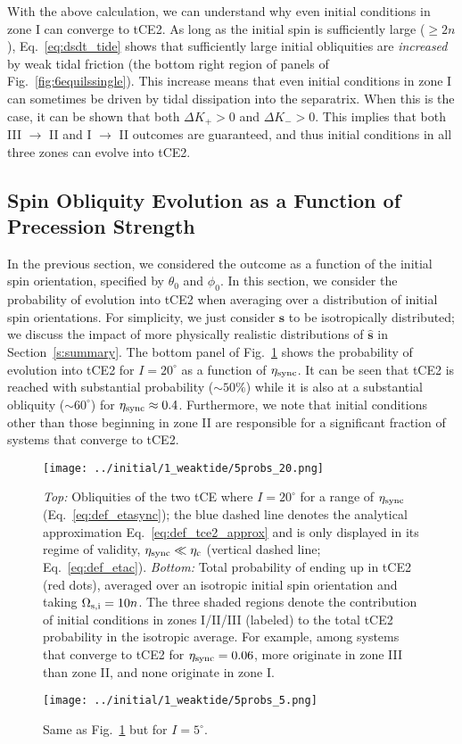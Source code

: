 \documentclass[
        fleqn,
        usenatbib,
    ]{mnras}
\newcommand*{\uv}[1]{\hat{\boldsymbol{\mathbf{#1}}}}
\begin{document}
With the above calculation, we can understand why even initial conditions in
zone I can converge to tCE2. As long as the initial spin is sufficiently large
($\geq 2n$), Eq.~\eqref{eq:dsdt_tide} shows that sufficiently large initial
obliquities are \emph{increased} by weak tidal friction (the bottom right
region of panels of Fig.~\ref{fig:6equilssingle}). This increase means that even
initial conditions in zone I can sometimes be driven by tidal dissipation into
the separatrix. When this is the case, it can be shown that both $\Delta K_+ >
0$ and $\Delta K_- > 0$. This implies that both III $\to$ II and I $\to$ II
outcomes are guaranteed, and thus initial conditions in all three zones can
evolve into tCE2.

\subsection{Spin Obliquity Evolution as a Function of Precession Strength
}\label{ss:tce2_etasync}

In the previous section, we considered the outcome as a function of the initial
spin orientation, specified by $\theta_0$ and $\phi_0$. In this section, we
consider the probability of evolution into tCE2 when averaging over a
distribution of initial spin orientations. For simplicity, we just consider
$\uv{s}$ to be isotropically distributed; we discuss the impact of more
physically realistic distributions of $\uv{s}$ in Section~\ref{s:summary}. The
bottom panel of Fig.~\ref{fig:probs20} shows the probability of evolution into
tCE2 for $I = 20^\circ$ as a function of $\eta_{\rm sync}$. It can be seen that
tCE2 is reached with substantial probability ($\sim 50\%$) while it is also
at a substantial obliquity ($\sim 60^\circ$) for $\eta_{\rm sync} \approx 0.4$.
Furthermore, we note that initial conditions other than those beginning in zone
II are responsible for a significant fraction of systems that converge to tCE2.
\begin{figure}
    \centering
    \texttt{[image: ../initial/1\_weaktide/5probs\_20.png]}
    \caption{\emph{Top:} Obliquities of the two tCE where $I = 20^\circ$ for a
    range of $\eta_{\rm sync}$ (Eq.~\ref{eq:def_etasync}); the blue dashed line
    denotes the analytical approximation Eq.~\eqref{eq:def_tce2_approx} and is
    only displayed in its regime of validity, $\eta_{\rm sync} \ll \eta_{\rm c}$
    (vertical dashed line; Eq.~\ref{eq:def_etac}). \emph{Bottom:} Total
    probability of ending up in tCE2 (red dots), averaged over an isotropic
    initial spin orientation and taking $\Omega_{\rm s, i} = 10n$. The three
    shaded regions denote the contribution of initial conditions in zones
    I/II/III (labeled) to the total tCE2 probability in the isotropic average.
    For example, among systems that converge to tCE2 for $\eta_{\rm sync} =
    0.06$, more originate in zone III than zone II, and none originate in zone
    I.}\label{fig:probs20}
\end{figure}
\begin{figure}
    \centering
    \texttt{[image: ../initial/1\_weaktide/5probs\_5.png]}
    \caption{Same as Fig.~\ref{fig:probs20} but for $I =
    5^\circ$.}\label{fig:probs5}
\end{figure}
\end{document}
